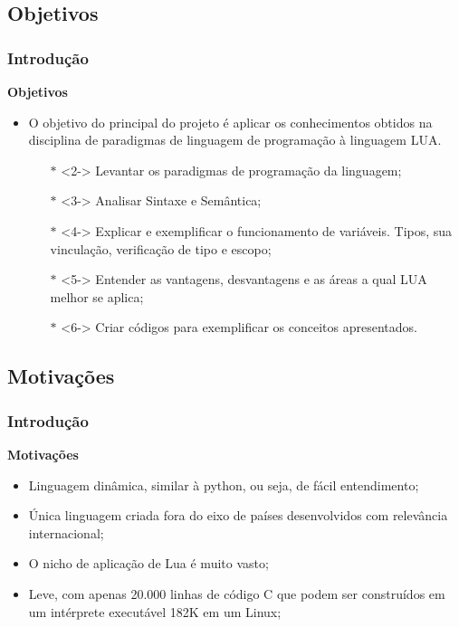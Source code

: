 \documentclass{beamer}
\begin{document}
\subsection{Objetivos}
\begin{frame}[fragile]
	\frametitle{Introdução}
	{\bf Objetivos}\vspace{0.4cm}
	\begin{itemize}
		\item<1-> O objetivo do principal do projeto é aplicar os conhecimentos obtidos na disciplina de paradigmas de linguagem de programação à linguagem LUA.
		\begin{itemize}
			\item[$\mathbb{*}$]<2-> Levantar os paradigmas de programação da linguagem;
			\item[$\mathbb{*}$]<3-> Analisar Sintaxe e Semântica;
			\item[$\mathbb{*}$]<4-> Explicar e exemplificar o funcionamento de variáveis. Tipos, sua vinculação, verificação de tipo e escopo;
			\item[$\mathbb{*}$]<5-> Entender as vantagens, desvantagens e as áreas a qual LUA melhor se aplica;
			\item[$\mathbb{*}$]<6-> Criar códigos para exemplificar os conceitos apresentados. 
		\end{itemize}
	\end{itemize}
\end{frame}

\subsection{Motivações}
\begin{frame}[fragile]
	\frametitle{Introdução}
	{\bf Motivações}\vspace{0.4cm}
	\begin{itemize}
		\item <1-> Linguagem dinâmica, similar à python, ou seja, de fácil entendimento;
		\item <2-> Única linguagem criada fora do eixo de países desenvolvidos com relevância internacional;
		\item <3-> O nicho de aplicação de Lua é muito vasto;
		\item <4-> Leve, com apenas 20.000 linhas de código C que podem ser construídos em um intérprete executável 182K em um Linux;
	\end{itemize}
\end{frame}
\end{document}

